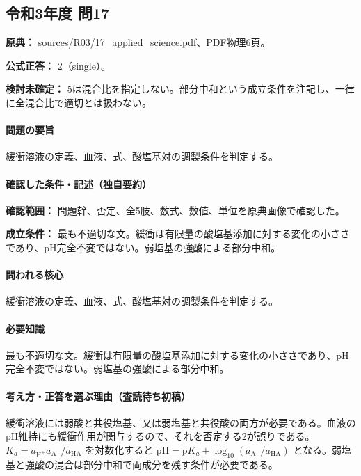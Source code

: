 \subsection{令和3年度 問17}
\label{q:r03-reg-applied-17}

\noindent\textbf{原典：} sources/R03/17\_applied\_science.pdf、PDF物理6頁。

\textbf{公式正答：} 2（single）。

\par\textbf{検討未確定：} 5は混合比を指定しない。部分中和という成立条件を注記し、一律に全混合比で適切とは扱わない。

\paragraph{問題の要旨} 緩衝溶液の定義、血液、式、酸塩基対の調製条件を判定する。

\paragraph{確認した条件・記述（独自要約）}\mbox{}\par

\noindent\textbf{確認範囲：} 問題幹、否定、全5肢、数式、数値、単位を原典画像で確認した。\par

\noindent\textbf{成立条件：} 最も不適切な文。緩衝は有限量の酸塩基添加に対する変化の小ささであり、pH完全不変ではない。弱塩基の強酸による部分中和。\par

\paragraph{問われる核心} 緩衝溶液の定義、血液、式、酸塩基対の調製条件を判定する。

\paragraph{必要知識} 最も不適切な文。緩衝は有限量の酸塩基添加に対する変化の小ささであり、pH完全不変ではない。弱塩基の強酸による部分中和。

\paragraph{考え方・正答を選ぶ理由（査読待ち初稿）} 緩衝溶液には弱酸と共役塩基、又は弱塩基と共役酸の両方が必要である。血液のpH維持にも緩衝作用が関与するので、それを否定する2が誤りである。\(K_a=a_{\mathrm{H^+}}a_{\mathrm{A^-}}/a_{\mathrm{HA}}\) を対数化すると \(\mathrm{pH=p}K_a+\log_{10}(a_{\mathrm{A^-}}/a_{\mathrm{HA}})\) となる。弱塩基と強酸の混合は部分中和で両成分を残す条件が必要である。


